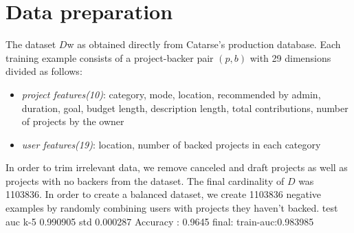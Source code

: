 \documentclass[cic,tc,english]{iiufrgs}
\begin{document}
\section{Data preparation}
The dataset \(D\)w as obtained directly from Catarse's production database. Each training example consists of a project-backer pair \((p,b)\) with 29 dimensions divided as follows:
\begin{itemize}
    \item \emph{project features(10)}: category, mode, location, recommended by admin, duration, goal, budget length, description length, total contributions, number of projects by the owner
    \item \emph{user features(19)}: location, number of backed projects in each category
\end{itemize}

In order to trim irrelevant data, we remove canceled and draft projects as well as projects with no backers from the dataset. The final cardinality of \(D\) was 1103836. In order to create a balanced dataset, we create 1103836 negative examples by randomly combining users with projects they haven't backed.
test auc k-5 0.990905 std 0.000287
Accuracy : 0.9645
final:
train-auc:0.983985




% 


{}
\end{document}

